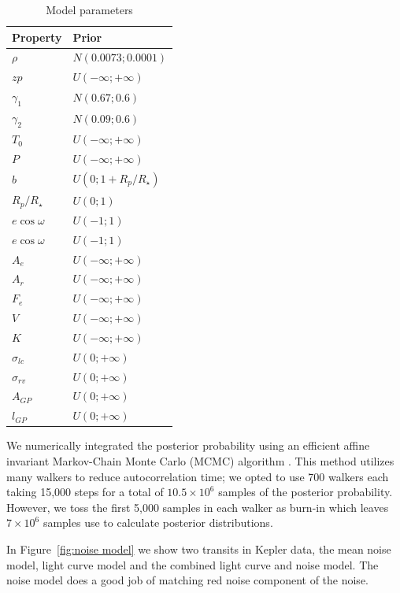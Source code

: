 \documentclass[apjl]{emulateapj}
\begin{document}
\begin{table}
\centering
\caption{Model parameters}\label{tab:priors}
\begin{tabular}{l l }
Property & Prior \\
\hline
$\rho$		&	$N(0.0073;0.0001)$ \\
$zp$				& 	$U(-\infty;+\infty)$\\
$\gamma_1$		&	$N(0.67;0.6)$ \\
$\gamma_2$		&	$N(0.09;0.6)$\\
$T_0$ & $U(-\infty;+\infty)$\\
$P$ & $U(-\infty;+\infty)$\\
$b$ & $U(0;1+R_{p}/R_{\star})$\\
$R_{p}/R_{\star}$ & $U(0;1)$ \\
$e\cos{\omega}$ &$U(-1;1)$ \\
$e\cos{\omega}$ & $U(-1;1)$\\
$A_e$ &$U(-\infty;+\infty)$ \\
$A_r$ & $U(-\infty;+\infty)$\\
$F_e$ & $U(-\infty;+\infty)$\\
$V$ &$U(-\infty;+\infty)$ \\
$K$ &$U(-\infty;+\infty)$ \\
$\sigma_{lc}$ & $U(0;+\infty)$\\
$\sigma_{rv}$ &$U(0;+\infty)$ \\
$A_{GP}$ &  $U(0;+\infty)$ \\
$l_{GP}$ &  $U(0;+\infty)$ \\
\hline
\end{tabular}
\end{table}

We numerically integrated the posterior probability using an efficient affine invariant Markov-Chain Monte Carlo (MCMC) algorithm \citep{goodman10,foreman13}.  This method utilizes many walkers to reduce autocorrelation time; we opted to use 700 walkers each taking 15,000 steps for a total of $10.5\times10^6$ samples of the posterior probability. However, we toss the first 5,000 samples in each walker as burn-in which leaves $7\times10^6$ samples use to calculate posterior distributions.

In Figure~\ref{fig:noise model} we show two transits in Kepler data, the mean noise model, light curve model and the combined light curve and noise model. The noise model does a good job of matching red noise component of the noise.
\end{document}
